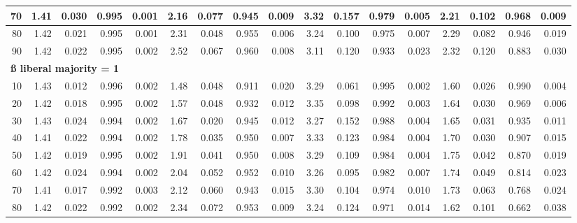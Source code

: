 \documentclass[
]{article}
\begin{document}
\begin{table}[H]
{\begin{tabular}{r|r|r|r|r|r|r|r|r|r|r|r|r|r|r|r|r}
\hline
\hspace{1em}70 & 1.41 & 0.030 & 0.995 & 0.001 & 2.16 & 0.077 & 0.945 & 0.009 & 3.32 & 0.157 & 0.979 & 0.005 & 2.21 & 0.102 & 0.968 & 0.009\\
\hline
\hspace{1em}80 & 1.42 & 0.021 & 0.995 & 0.001 & 2.31 & 0.048 & 0.955 & 0.006 & 3.24 & 0.100 & 0.975 & 0.007 & 2.29 & 0.082 & 0.946 & 0.019\\
\hline
\hspace{1em}90 & 1.42 & 0.022 & 0.995 & 0.002 & 2.52 & 0.067 & 0.960 & 0.008 & 3.11 & 0.120 & 0.933 & 0.023 & 2.32 & 0.120 & 0.883 & 0.030\\
\hline
\multicolumn{17}{l}{\textbf{ß liberal majority = 1}}\\
\hline
\hspace{1em}10 & 1.43 & 0.012 & 0.996 & 0.002 & 1.48 & 0.048 & 0.911 & 0.020 & 3.29 & 0.061 & 0.995 & 0.002 & 1.60 & 0.026 & 0.990 & 0.004\\
\hline
\hspace{1em}20 & 1.42 & 0.018 & 0.995 & 0.002 & 1.57 & 0.048 & 0.932 & 0.012 & 3.35 & 0.098 & 0.992 & 0.003 & 1.64 & 0.030 & 0.969 & 0.006\\
\hline
\hspace{1em}30 & 1.43 & 0.024 & 0.994 & 0.002 & 1.67 & 0.020 & 0.945 & 0.012 & 3.27 & 0.152 & 0.988 & 0.004 & 1.65 & 0.031 & 0.935 & 0.011\\
\hline
\hspace{1em}40 & 1.41 & 0.022 & 0.994 & 0.002 & 1.78 & 0.035 & 0.950 & 0.007 & 3.33 & 0.123 & 0.984 & 0.004 & 1.70 & 0.030 & 0.907 & 0.015\\
\hline
\hspace{1em}50 & 1.42 & 0.019 & 0.995 & 0.002 & 1.91 & 0.041 & 0.950 & 0.008 & 3.29 & 0.109 & 0.984 & 0.004 & 1.75 & 0.042 & 0.870 & 0.019\\
\hline
\hspace{1em}60 & 1.42 & 0.024 & 0.994 & 0.002 & 2.04 & 0.052 & 0.952 & 0.010 & 3.26 & 0.095 & 0.982 & 0.007 & 1.74 & 0.049 & 0.814 & 0.023\\
\hline
\hspace{1em}70 & 1.41 & 0.017 & 0.992 & 0.003 & 2.12 & 0.060 & 0.943 & 0.015 & 3.30 & 0.104 & 0.974 & 0.010 & 1.73 & 0.063 & 0.768 & 0.024\\
\hline
\hspace{1em}80 & 1.42 & 0.022 & 0.992 & 0.002 & 2.34 & 0.072 & 0.953 & 0.009 & 3.24 & 0.124 & 0.971 & 0.014 & 1.62 & 0.101 & 0.662 & 0.038\\

\end{tabular}}
\end{table}
\end{document}
